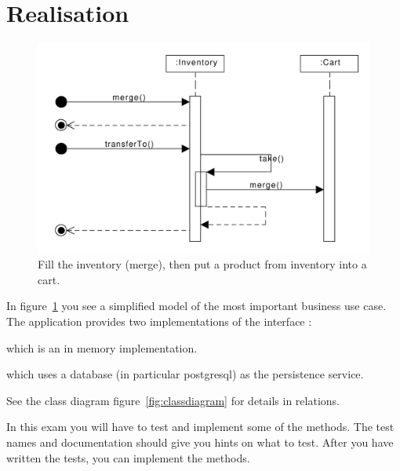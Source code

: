 \section{Realisation}
\label{sec:realisation} 
\begin{figure}
  \includegraphics[width=.4\textwidth]{figures/fillInventorySellProduct_seqd}
  \caption{\label{seq:mergandtransfer}Fill the inventory (merge), then
    put a product from inventory into a cart.}
\end{figure}%
In figure~\ref{seq:mergandtransfer} you see a simplified model of the most
important business use case.
%
The application provides two implementations of the interface 
:
\begin{enumerate*}
\item {} which is an in memory implementation.
\item {} which uses a database (in particular
  postgresql) as the persistence service.
\end{enumerate*}

See the class diagram figure~\ref{fig:classdiagram} for details in
relations.

In this exam you will have to test and implement some of the methods.
The test names and documentation should give you hints on what to
test. After you have written the tests, you can implement the methods.
\clearpage
